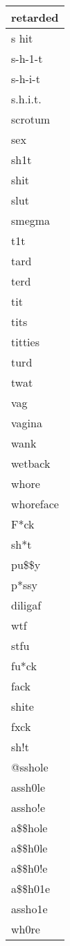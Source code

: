 \begin{longtable}{|l|}
retarded \\ \hline 
s hit \\ \hline 
s-h-1-t \\ \hline 
s-h-i-t \\ \hline 
s.h.i.t. \\ \hline 
scrotum \\ \hline 
sex \\ \hline 
sh1t \\ \hline 
shit \\ \hline 
slut \\ \hline 
smegma \\ \hline 
t1t \\ \hline 
tard \\ \hline 
terd \\ \hline 
tit \\ \hline 
tits \\ \hline 
titties \\ \hline 
turd \\ \hline 
twat \\ \hline 
vag \\ \hline 
vagina \\ \hline 
wank \\ \hline 
wetback \\ \hline 
whore \\ \hline 
whoreface \\ \hline 
F*ck \\ \hline 
sh*t \\ \hline 
pu\$\$y \\ \hline 
p*ssy \\ \hline 
diligaf \\ \hline 
wtf \\ \hline 
stfu \\ \hline 
fu*ck \\ \hline 
fack \\ \hline 
shite \\ \hline 
fxck \\ \hline 
sh!t \\ \hline 
@sshole \\ \hline 
assh0le \\ \hline 
assho!e \\ \hline 
a\$\$hole \\ \hline 
a\$\$h0le \\ \hline 
a\$\$h0!e \\ \hline 
a\$\$h01e \\ \hline 
assho1e \\ \hline 
wh0re \\ \hline 

\end{longtable}

